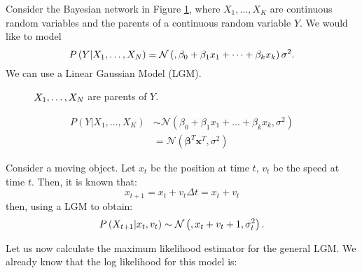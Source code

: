 \begin{example}

    Consider the Bayesian network in Figure \ref{fig:GLM}, where \(X_{1},\dots, X_{K}\) are continuous random variables and the parents of a continuous random variable \(Y\).
    We would like to model
    \[
        P \left( Y| X_1,\dots,X_N \right) = \mathcal N \left( {}, {\beta_0 + \beta_1 x_1 + \dots + \beta_k x_k} \right ){\sigma^2}.
    \]
    We can use a Linear Gaussian Model (LGM).

    \begin{figure}[H]
        \centering
        \caption{\(X_1,\dots,X_N\) are parents of \(Y\).}
        \label{fig:GLM}
    \end{figure}

    \begin{align*}
        P(Y|X_{1},\dots, X_{K}) & \sim \mathcal N \left( \beta_{0} + \beta_{1}x_{1} + \dots + \beta_{k}x_{k}, \sigma^2 \right) \\
                                & = \mathcal N ( \mathbf{\beta}^{T} \mathbf{x}^{T}, \sigma^{2} )
    \end{align*}

\end{example}

\begin{example}
    Consider a moving object. Let \(x_t\) be the position at time \(t\), \(v_t\) be the speed at time \(t\). Then, it is known that:
    \[
        x_{t+1} = x_t + v_t \Delta t = x_t + v_t
    \]
    then, using a LGM to obtain:
    \[
        P\left(X_{t+1} | x_t,v_t\right) \sim \mathcal N \left( {}, {x_t + v_t + 1, \sigma_t^2} \right ).
    \]
\end{example}


Let us now calculate the maximum likelihood estimator for the general LGM. We already know that the log likelihood for this model is:


